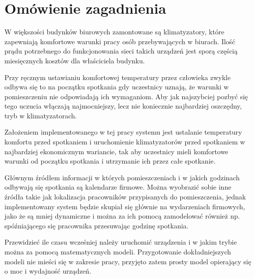 \section{Omówienie zagadnienia}
W większości budynków biurowych zamontowane są klimatyzatory, które zapewniają komfortowe warunki pracy osób przebywających w biurach. 
Ilość prądu potrzebnego do funkcjonowania sieci takich urządzeń jest sporą częścią miesięcznych kosztów dla właściciela budynku.

Przy ręcznym ustawianiu komfortowej temperatury przez człowieka zwykle odbywa się to na początku spotkania gdy uczestnicy uznają, że warunki w pomieszczeniu nie odpowiadają ich wymaganiom. Aby jak najszybciej pozbyć się tego uczucia włączają najmocniejszy, lecz nie koniecznie najbardziej oszczędny, tryb w klimatyzatorach.

Założeniem implementowanego w tej pracy systemu jest ustalanie temperatury komfortu przed spotkaniem i uruchomienie klimatyzatorów przed spotkaniem w najbardziej ekonomicznym wariancie, tak aby uczestnicy mieli komfortowe warunki od początku spotkania i utrzymanie ich przez całe spotkanie. 

Głównym źródłem informacji w których pomieszczeniach i w jakich godzinach odbywają się spotkania są kalendarze firmowe. Można wyobrazić sobie inne źródła takie jak lokalizacja pracowników przypisanych do pomieszczenia, jednak implementowany system będzie skupiał się głównie na wydarzeniach firmowych, jako że są mniej dynamiczne i można za ich pomocą zamodelować również np. spóźniającego się pracownika przesuwając godzinę spotkania.

Przewidzieć ile czasu wcześniej należy uruchomić urządzenia i w jakim trybie można za pomocą matematycznych modeli. Przygotowanie dokładniejszych modeli nie mieści się w zakresie pracy, przyjęto zatem prosty model opierający się o moc i wydajność urządzeń. 
